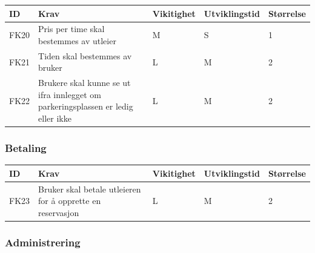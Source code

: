 \documentclass[12pt]{article}
\newcommand{\celll}{\cellcolor{lime!25}}
\begin{document}
        \begin{tabular}{|p{2cm}|p{6cm}|
            >{\centering\arraybackslash}p{2cm}|
            >{\centering\arraybackslash}p{2cm}|
            >{\centering\arraybackslash}p{2cm}|} 
            \hline
            \bf ID & \bf Krav & \bf Vikitighet & \bf Utviklingstid & \bf Størrelse\\
            \hline
            FK20
            &
            Pris per time skal bestemmes av utleier
            & M & S & \celll 1\\
            \hline
            FK21
            &
            Tiden skal bestemmes av bruker
            & L & M & \celll 2\\
            \hline
            FK22
            &
            Brukere skal kunne se ut ifra innlegget om parkeringsplassen er ledig eller ikke
            & L & M & \celll 2\\
            \hline
        \end{tabular}
        
        \subsubsection{Betaling}
        
        \begin{tabular}{|p{2cm}|p{6cm}|
            >{\centering\arraybackslash}p{2cm}|
            >{\centering\arraybackslash}p{2cm}|
            >{\centering\arraybackslash}p{2cm}|} 
            \hline
            \bf ID & \bf Krav & \bf Vikitighet & \bf Utviklingstid & \bf Størrelse\\
            \hline
            FK23
            &
            Bruker skal betale utleieren for å opprette en reservasjon
            & L & M & \celll 2\\
            \hline
        \end{tabular}
        
        \subsubsection{Administrering}
        
\end{document}
